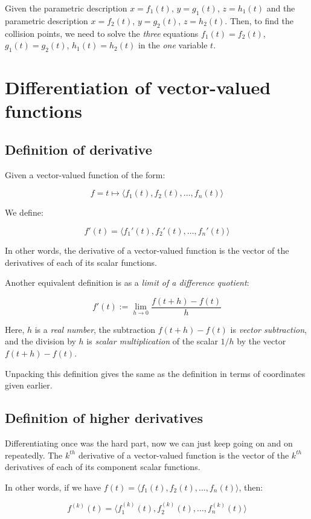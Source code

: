\documentclass[10pt]{amsart}
\begin{document}
Given the parametric description $x = f_1(t)$, $y = g_1(t)$, $z =
h_1(t)$ and the parametric description $x = f_2(t)$, $y = g_2(t)$, $z
= h_2(t)$. Then, to find the collision points, we need to solve the
{\em three} equations $f_1(t) = f_2(t)$, $g_1(t) = g_2(t)$, $h_1(t) =
h_2(t)$ in the {\em one} variable $t$.

\section{Differentiation of vector-valued functions}

\subsection{Definition of derivative}

Given a vector-valued function of the form:

$$f = t \mapsto \langle f_1(t), f_2(t), \dots, f_n(t) \rangle$$

We define:

$$f'(t) = \langle f_1'(t), f_2'(t), \dots, f_n'(t) \rangle$$

In other words, the derivative of a vector-valued function is the
vector of the derivatives of each of its scalar functions.

Another equivalent definition is as a {\em limit of a difference
quotient}:

$$f'(t) := \lim_{h \to 0} \frac{f(t + h) - f(t)}{h}$$

Here, $h$ is a {\em real number}, the subtraction $f(t + h) - f(t)$ is
{\em vector subtraction}, and the division by $h$ is {\em scalar
multiplication} of the scalar $1/h$ by the vector $f(t + h) - f(t)$.

Unpacking this definition gives the same as the definition in terms of
coordinates given earlier.

\subsection{Definition of higher derivatives}

Differentiating once was the hard part, now we can just keep going on
and on repeatedly. The $k^{th}$ derivative of a vector-valued function
is the vector of the $k^{th}$ derivatives of each of its component
scalar functions.

In other words, if we have $f(t) = \langle f_1(t), f_2(t), \dots,
f_n(t) \rangle$, then:

$$f^{(k)}(t) = \langle f_1^{(k)}(t), f_2^{(k)}(t), \dots, f_n^{(k)}(t) \rangle$$
\end{document}
